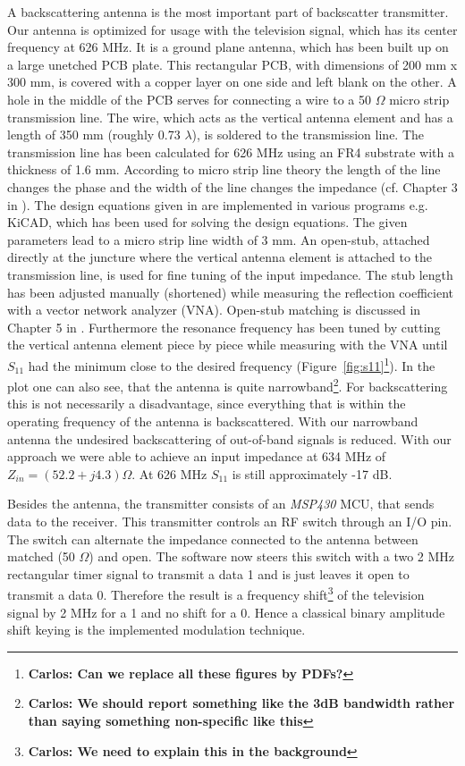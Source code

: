 \documentclass[conference]{IEEEtran}
\newcommand{\cp}[1]{\footnote{{\bf Carlos: #1}}}
\begin{document}
A backscattering antenna is the most important part of backscatter transmitter. Our antenna is optimized for usage with the television signal, which has its center frequency at 626 MHz. It is a ground plane antenna, which has been built up on a large unetched PCB plate. This rectangular PCB, with dimensions of 200 mm x 300 mm, is covered with a copper layer on one side and left blank on the other. A hole in the middle of the PCB serves for connecting a wire to a 50 \ensuremath{\Omega} micro strip transmission line. The wire, which acts as the vertical antenna element and has a length of 350 mm (roughly 0.73 \ensuremath{\lambda}), is soldered to the transmission line. The transmission line has been calculated for 626 MHz using an FR4 substrate with a thickness of 1.6 mm. According to micro strip line theory the length of the line changes the phase and the width of the line changes the impedance (cf. Chapter 3 in \cite{pozar_microwave_2011}). The design equations given in \cite{pozar_microwave_2011} are implemented in various programs e.g. KiCAD, which has been used for solving the design equations. The given parameters lead to a micro strip line width of 3 mm. An open-stub, attached directly at the juncture where the vertical antenna element is attached to the transmission line, is used for fine tuning of the input impedance. The stub length has been adjusted manually (shortened) while measuring the reflection coefficient with a vector network analyzer (VNA). Open-stub matching is discussed in Chapter 5 in \cite{pozar_microwave_2011}. Furthermore the resonance frequency has been tuned by cutting the vertical antenna element piece by piece while measuring with the VNA until \ensuremath{S_{\text{11}}} had the minimum close to the desired frequency (Figure~\ref{fig:s11}\cp{Can we replace all these figures by PDFs?}). In the plot one can also see, that the antenna is quite narrowband\cp{We should report something like the 3dB bandwidth rather than saying something non-specific like this}. For backscattering this is not necessarily a disadvantage, since everything that is within the operating frequency of the antenna is backscattered. With our narrowband antenna the undesired backscattering of out-of-band signals is reduced. With our approach we were able to achieve an input impedance at 634 MHz of \ensuremath{Z_{in}=(52.2 + j 4.3) \Omega}. At 626 MHz \ensuremath{S_{\text{11}}} is still approximately -17 dB.

Besides the antenna, the transmitter consists of an \textit{MSP430} MCU, that sends data to the receiver. This transmitter controls an RF switch through an I/O pin. The switch can alternate the impedance connected to the antenna between matched (50 \ensuremath{\Omega}) and open. The software now steers this switch with a two 2 MHz rectangular timer signal to transmit a data 1 and is just leaves it open to transmit a data 0. Therefore the result is a frequency shift\cp{We need to explain this in the background} of the television signal by 2 MHz for a 1 and no shift for a 0. Hence a classical binary amplitude shift keying is the implemented modulation technique.    
\end{document}

